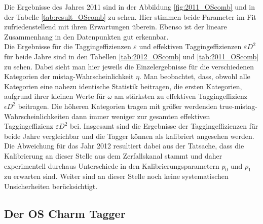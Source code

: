 Die Ergebnisse des Jahres \num{2011} sind in der Abbildung \ref{fig:2011_OScomb}  und in der Tabelle \ref{tab:result_OScomb} zu sehen. Hier stimmen beide Parameter im Fit zufriedenstellend mit ihren Erwartungen überein. Ebenso ist der lineare Zusammenhang in den Datenpunkten gut erkennbar.\\
Die Ergebnisse für die Taggingeffizienzen $\varepsilon$ und effektiven Taggingeffizienzen $\varepsilon D^2$ für beide Jahre sind in den Tabellen \ref{tab:2012_OScomb} und \ref{tab:2011_OScomb} zu sehen. Dabei sieht man hier jeweils die Einzelergebnisse für die verschiedenen Kategorien der mistag-Wahrscheinlichkeit $\eta$. Man beobachtet, dass, obwohl alle Kategorien eine nahezu identische Statistik beitragen, die ersten Kategorien, aufgrund ihrer kleinen Werte für $\omega$ am stärksten zu effektiven Taggingeffizienz $\epsilon D^2$ beitragen. Die höheren Kategorien tragen mit größer werdenden true-mistag-Wahrscheinlichkeiten dann immer weniger zur gesamten effektiven Taggingeffizienz $\varepsilon D^2$ bei. Insgesamt sind die Ergebnisse der Taggingeffizienzen für beide Jahre vergleichbar und die Tagger können als kalibriert angesehen werden. Die Abweichung für das Jahr \num{2012} resultiert dabei aus der Tatsache, dass die Kalibrierung an dieser Stelle aus dem Zerfallskanal \BuToJPsiKp stammt und daher experimentell durchaus Unterschiede in den Kalibrierungsparametern $p_0$ und $p_1$ zu erwarten sind. Weiter sind an dieser Stelle noch keine systematischen Unsicherheiten berücksichtigt. 

\subsection{Der OS Charm Tagger}

